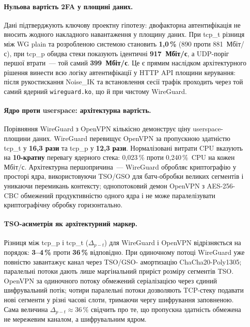 \paragraph*{Нульова вартість 2FA у площині даних.}
Дані підтверджують ключову проектну гіпотезу: двофакторна автентифікація
не вносить жодного накладного навантаження у площину даних. При tcp\_t
різниця між WG plain та розробленою системою становить \textbf{1{,}0\,\%}
(890 проти 881~Мбіт/с), при tcp\_p обидва стеки показують ідентичні
\textbf{917~Мбіт/с}, а UDP-поріг першої втрати~--- той самий \textbf{399~Мбіт/с}.
Це є прямим наслідком архітектурного рішення винести всю логіку автентифікації
у HTTP API площини керування: після рукостискання Noise\_IK \cite{perrin2018noise}
та встановлення сесії трафік проходить через той самий ядерний \texttt{wireguard.ko},
що й при чистому WireGuard.

\paragraph*{Ядро проти userspace: архітектурна вартість.}
Порівняння WireGuard з OpenVPN кількісно демонструє ціну userspace-площини
даних. WireGuard перевищує OpenVPN за
пропускною здатністю tcp\_t у \textbf{16{,}3 рази} та tcp\_p у
\textbf{12{,}3 рази}. Нормалізовані витрати CPU вказують на \textbf{10-кратну}
перевагу ядерного стека: 0{,}023\,\% проти 0{,}240\,\%~CPU на кожен Мбіт/с.
Архітектурна першопричина~--- WireGuard обробляє криптографію у просторі ядра,
використовуючи TSO/GSO для батч-обробки великих сегментів і уникаючи
перемикань контексту; однопотоковий демон OpenVPN з AES-256-CBC обмежений
продуктивністю одного ядра і не може паралелізувати криптографічну обробку
горизонтально.

\paragraph*{TSO-асиметрія як архітектурний маркер.}
Різниця між tcp\_p і tcp\_t ($\Delta_{p-t}$) для WireGuard і OpenVPN
відрізняється на порядок: \textbf{3--4\,\%} проти \textbf{36\,\%} відповідно.
При одиночному потоці WireGuard уже повністю завантажує канал через TSO/GSO-
амортизацію ChaCha20-Poly1305; паралельні потоки дають лише маргінальний
приріст розміру сегментів TSO. OpenVPN за одиночного потоку обмежений
серіалізацією через єдиний шифрувальний потік; чотири паралельні потоки
дозволяють TCP-стеку подавати нові сегменти у різні часові слоти, тримаючи
чергу шифрування заповненою. Сама величина $\Delta_{p-t} \approx 36\,\%$
свідчить про те, що пропускна здатність обмежена не мережевим каналом,
а шифрувальним ядром.

